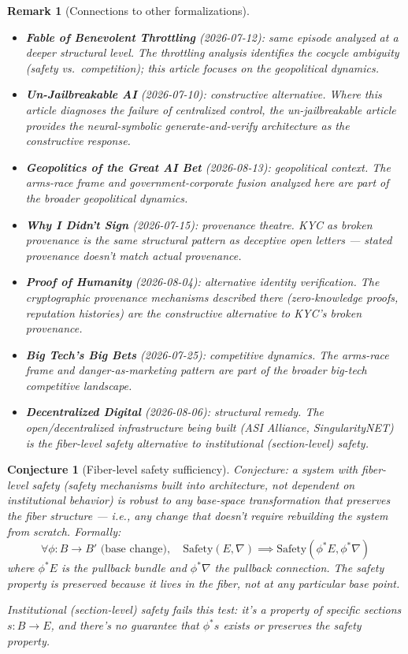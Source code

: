 \documentclass[11pt,a4paper]{article}
\newtheorem{conjecture}[definition]{Conjecture}
\newtheorem{remark}[definition]{Remark}
\begin{document}
\begin{remark}[Connections to other formalizations]
\begin{itemize}
\item \textbf{Fable of Benevolent Throttling} (2026-07-12): same
  episode analyzed at a deeper structural level. The throttling
  analysis identifies the cocycle ambiguity (safety vs.\ competition);
  this article focuses on the geopolitical dynamics.
\item \textbf{Un-Jailbreakable AI} (2026-07-10): constructive
  alternative. Where this article diagnoses the failure of centralized
  control, the un-jailbreakable article provides the neural-symbolic
  generate-and-verify architecture as the constructive response.
\item \textbf{Geopolitics of the Great AI Bet} (2026-08-13):
  geopolitical context. The arms-race frame and government-corporate
  fusion analyzed here are part of the broader geopolitical dynamics.
\item \textbf{Why I Didn't Sign} (2026-07-15): provenance theatre.
  KYC as broken provenance is the same structural pattern as
  deceptive open letters --- stated provenance doesn't match actual
  provenance.
\item \textbf{Proof of Humanity} (2026-08-04): alternative identity
  verification. The cryptographic provenance mechanisms described
  there (zero-knowledge proofs, reputation histories) are the
  constructive alternative to KYC's broken provenance.
\item \textbf{Big Tech's Big Bets} (2026-07-25): competitive
  dynamics. The arms-race frame and danger-as-marketing pattern
  are part of the broader big-tech competitive landscape.
\item \textbf{Decentralized Digital} (2026-08-06): structural remedy.
  The open/decentralized infrastructure being built (ASI Alliance,
  SingularityNET) is the fiber-level safety alternative to
  institutional (section-level) safety.
\end{itemize}
\end{remark}

\begin{conjecture}[Fiber-level safety sufficiency]
Conjecture: a system with fiber-level safety (safety mechanisms
built into architecture, not dependent on institutional behavior)
is robust to any base-space transformation that preserves the fiber
structure --- i.e., any change that doesn't require rebuilding the
system from scratch. Formally:
\[
  \forall \phi : B \to B' \text{ (base change)}, \quad
  \text{Safety}(E, \nabla) \implies
  \text{Safety}(\phi^* E, \phi^* \nabla)
\]
where $\phi^* E$ is the pullback bundle and $\phi^* \nabla$ the
pullback connection. The safety property is preserved because it
lives in the fiber, not at any particular base point.

Institutional (section-level) safety fails this test: it's a property
of specific sections $s : B \to E$, and there's no guarantee that
$\phi^* s$ exists or preserves the safety property.
\end{conjecture}
\end{document}
